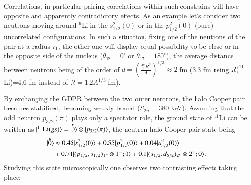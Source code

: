 \begin{subappendices}
 
 Correlations, in particular pairing correlations within such constrains will have opposite and apparently contradictory effects. As an example let's consider two neutrons moving around $^9$Li in the $s^2_{1/2}(0)$ or in the   $p^2_{1/2}(0)$ (pure) uncorrelated configurations. In such a situation, fixing one of the neutrons of the pair at a radius $r_1$, the other one will display equal possibility to be close or in the opposite side of the nucleus ($\theta_{12}=0^\circ$ or $\theta_{12}=180^\circ$), the average distance between neutrons being of the order of $d=\left(\frac{\frac{4\pi}{3}R^3}{A}\right)^{1/3}\approx 2$ fm (3.3 fm using $R(^{11}$Li)=4.6 fm instead of $R=1.2 A^{1/3}$ fm).
 
 By exchanging the GDPR between the two outer neutrons, the halo Cooper pair becomes stabilized, becoming weakly bound ($S_{2n}=380$ keV). Assuming that the odd neutron $p_{3/2}(\pi)$ plays only a spectator role, the ground state of $^{11}$Li can be written as $|{^{11}\text{Li}(gs)} \rangle=|{\tilde{\tilde 0}} \rangle\otimes|{p_{3/2}(\pi)} \rangle$, the neutron halo Cooper pair state being
    \begin{align}
\nonumber|{\tilde{\tilde 0}} \rangle&\approx 0.45|{s^2_{1/2}(0)} \rangle+0.55|{p^2_{1/2}(0)} \rangle+0.04|{d^2_{5/2}(0)} \rangle\\
&+0.71|{(p_{1/2},s_{1/2})_{1^-}\otimes 1^{-};0} \rangle+0.1|{(s_{1/2},d_{5/2})_{2^+}\otimes 2^{+};0} \rangle.
    \end{align}
    Studying this state microscopically one observes two contrasting effects taking place:
    

\end{subappendices}
